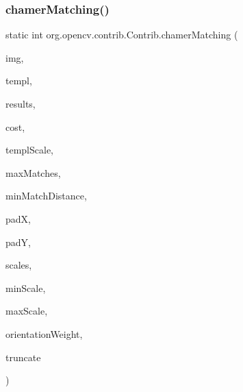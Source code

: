 \subsubsection{\texorpdfstring{chamer\+Matching()}{chamerMatching()}\hspace{0.1cm}{\footnotesize\ttfamily [1/2]}}
{\footnotesize\ttfamily static int org.\+opencv.\+contrib.\+Contrib.\+chamer\+Matching (\begin{DoxyParamCaption}\item[{\mbox{\hyperlink{classorg_1_1opencv_1_1core_1_1_mat}{Mat}}}]{img,  }\item[{\mbox{\hyperlink{classorg_1_1opencv_1_1core_1_1_mat}{Mat}}}]{templ,  }\item[{List$<$ \mbox{\hyperlink{classorg_1_1opencv_1_1core_1_1_mat_of_point}{Mat\+Of\+Point}} $>$}]{results,  }\item[{\mbox{\hyperlink{classorg_1_1opencv_1_1core_1_1_mat_of_float}{Mat\+Of\+Float}}}]{cost,  }\item[{double}]{templ\+Scale,  }\item[{int}]{max\+Matches,  }\item[{double}]{min\+Match\+Distance,  }\item[{int}]{padX,  }\item[{int}]{padY,  }\item[{int}]{scales,  }\item[{double}]{min\+Scale,  }\item[{double}]{max\+Scale,  }\item[{double}]{orientation\+Weight,  }\item[{double}]{truncate }\end{DoxyParamCaption})\hspace{0.3cm}{\ttfamily [static]}}

\mbox{\label{classorg_1_1opencv_1_1contrib_1_1_contrib_a591ee5c93fd25c8209189898e55f7026}} 
